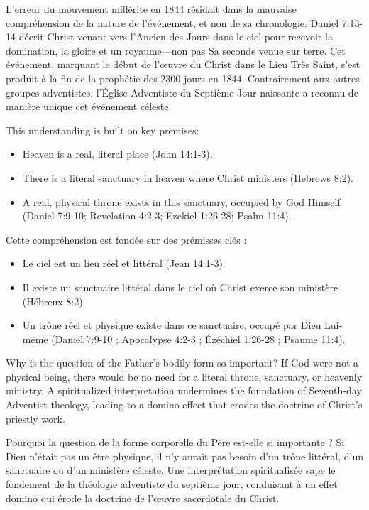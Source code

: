 L'erreur du mouvement millérite en 1844 résidait dans la mauvaise compréhension de la nature de l'événement, et non de sa chronologie. Daniel 7:13-14 décrit Christ venant vers l'Ancien des Jours dans le ciel pour recevoir la domination, la gloire et un royaume—non pas Sa seconde venue sur terre. Cet événement, marquant le début de l'œuvre du Christ dans le Lieu Très Saint, s'est produit à la fin de la prophétie des 2300 jours en 1844. Contrairement aux autres groupes adventistes, l'Église Adventiste du Septième Jour naissante a reconnu de manière unique cet événement céleste.


This understanding is built on key premises:
\begin{itemize}
    \item Heaven is a real, literal place (John 14:1-3).
    \item There is a literal sanctuary in heaven where Christ ministers (Hebrews 8:2). 
    \item A real, physical throne exists in this sanctuary, occupied by God Himself (Daniel 7:9-10; Revelation 4:2-3; Ezekiel 1:26-28; Psalm 11:4).
\end{itemize}


Cette compréhension est fondée sur des prémisses clés :
\begin{itemize}
    \item Le ciel est un lieu réel et littéral (Jean 14:1-3).
    \item Il existe un sanctuaire littéral dans le ciel où Christ exerce son ministère (Hébreux 8:2).
    \item Un trône réel et physique existe dans ce sanctuaire, occupé par Dieu Lui-même (Daniel 7:9-10 ; Apocalypse 4:2-3 ; Ézéchiel 1:26-28 ; Psaume 11:4).
\end{itemize}


Why is the question of the Father’s bodily form so important? If God were not a physical being, there would be no need for a literal throne, sanctuary, or heavenly ministry. A spiritualized interpretation undermines the foundation of Seventh-day Adventist theology, leading to a domino effect that erodes the doctrine of Christ’s priestly work.


Pourquoi la question de la forme corporelle du Père est-elle si importante ? Si Dieu n'était pas un être physique, il n'y aurait pas besoin d'un trône littéral, d'un sanctuaire ou d'un ministère céleste. Une interprétation spiritualisée sape le fondement de la théologie adventiste du septième jour, conduisant à un effet domino qui érode la doctrine de l'œuvre sacerdotale du Christ.


